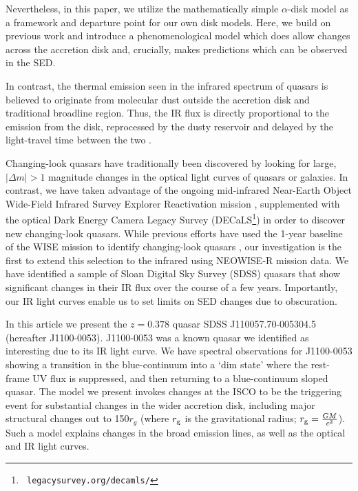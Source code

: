 \documentclass[a4paper,fleqn,usenatbib]{mnras}
\begin{document}
{Nevertheless, in this paper, we utilize the
mathematically simple $\alpha$-disk model as a framework and departure
point for our own disk models. Here, we build on previous work
\citep{Sirko_Goodman2003, Zimmerman2005, Hameury2009} and introduce a
phenomenological model which does allow changes across the accretion
disk and, crucially, makes predictions which can be observed in the
SED.

In contrast, the thermal emission seen in the infrared spectrum of quasars 
is believed to originate from molecular dust outside the accretion disk and 
traditional broadline region.  Thus, the IR flux is directly
proportional to the emission from the disk, reprocessed by the dusty
reservoir and delayed by the light-travel time between the two
\citep[see ][for reviews]{Antonucci1993, Perlman2008, Lasota2016}.
}

Changing-look quasars have traditionally been discovered by looking
for large, $| \Delta m | >1$ magnitude changes in the optical light
curves of quasars or galaxies. In contrast, we have taken advantage of
the ongoing mid-infrared Near-Earth Object Wide-Field Infrared Survey
Explorer Reactivation mission \citep[NEOWISE-R; ][]{Mainzer2014,
Meisner2017a, Meisner2017b}, supplemented with the optical Dark Energy
Camera Legacy Survey (DECaLS\footnote{{\tt
legacysurvey.org/decamls/}}) in order to discover new changing-look
quasars.  While previous efforts have used the 1-year baseline of the
WISE mission to identify changing-look quasars
\citep[e.g.,][]{Assef2017, Stern2018}, our investigation is the first to extend
this selection to the infrared using NEOWISE-R mission data. We have
identified a sample of Sloan Digital Sky Survey (SDSS) quasars that
show significant changes in their IR flux over the course of a few
years. Importantly, our IR light curves enable us to set limits on SED
changes due to obscuration.

In this article we present the $z=0.378$ quasar SDSS
J110057.70-005304.5 (hereafter J1100-0053).  J1100-0053 was a known
quasar we identified as interesting due to its IR light curve. We have
spectral observations for J1100-0053 showing a transition in the
blue-continuum into a `dim state' where the rest-frame UV flux is
suppressed, and then returning to a blue-continuum sloped quasar.  The
model we present invokes changes at the ISCO to be the triggering
event for substantial changes in the wider accretion disk, including
major structural changes out to 150$r_{g}$ (where $r_{\rm g}$ is the
gravitational radius; $r_{\rm g}=\frac{GM}{c^2}$).  Such a model
explains changes in the broad emission lines, as well as the optical
and IR light curves. 
\end{document}
